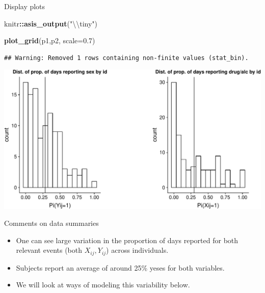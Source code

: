 \documentclass[ignorenonframetext,]{beamer}
\newenvironment{Shaded}{\begin{snugshade}}{\end{snugshade}}
\newcommand{\KeywordTok}[1]{\textcolor[rgb]{0.13,0.29,0.53}{\textbf{#1}}}
\newcommand{\DataTypeTok}[1]{\textcolor[rgb]{0.13,0.29,0.53}{#1}}
\newcommand{\FloatTok}[1]{\textcolor[rgb]{0.00,0.00,0.81}{#1}}
\newcommand{\CharTok}[1]{\textcolor[rgb]{0.31,0.60,0.02}{#1}}
\newcommand{\StringTok}[1]{\textcolor[rgb]{0.31,0.60,0.02}{#1}}
\newcommand{\OperatorTok}[1]{\textcolor[rgb]{0.81,0.36,0.00}{\textbf{#1}}}
\newcommand{\NormalTok}[1]{#1}
\providecommand{\tightlist}{%
  \setlength{\itemsep}{0pt}\setlength{\parskip}{0pt}}
\begin{document}
\begin{frame}[fragile]{Display plots}

\begin{Shaded}
\begin{Highlighting}[]
\NormalTok{knitr}\OperatorTok{::}\KeywordTok{asis_output}\NormalTok{(}\StringTok{"}\CharTok{\textbackslash{}\textbackslash{}}\StringTok{tiny"}\NormalTok{)}
\end{Highlighting}
\end{Shaded}

\tiny

\begin{Shaded}
\begin{Highlighting}[]
\KeywordTok{plot_grid}\NormalTok{(p1,p2, }\DataTypeTok{scale=}\FloatTok{0.7}\NormalTok{)}
\end{Highlighting}
\end{Shaded}

\begin{verbatim}
## Warning: Removed 1 rows containing non-finite values (stat_bin).
\end{verbatim}

\includegraphics{Chapter5CodePart2_files/figure-beamer/plots-1.pdf}

\end{frame}

\begin{frame}{Comments on data summaries}

\begin{itemize}
\tightlist
\item
  One can see large variation in the proportion of days reported for
  both relevant events (both \(X_{ij},Y_{ij}\)) across individuals.
\item
  Subjects report an average of around 25\% yeses for both variables.
\item
  We will look at ways of modeling this variability below.
\end{itemize}

\end{frame}
\end{document}
